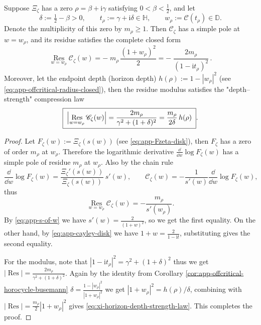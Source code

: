 \begin{theorem}\label{thm:xi-horizon-pole-residue-depth-strength}
Suppose \(\Xi_{\zeta}\) has a zero \(\rho=\beta+\mathrm{i}\gamma\) satisfying \(0<\beta<\tfrac12\), and let
\[
\delta:=\tfrac12-\beta>0,\qquad
t_{\rho}:=\gamma+\mathrm{i}\delta\in\mathbb{H},\qquad
w_{\rho}:=\mathcal{C}(t_{\rho})\in\mathbb{D}.
\]
Denote the multiplicity of this zero by \(m_{\rho}\ge 1\).
Then \(\mathscr{C}_{\zeta}\) has a simple pole at \(w=w_{\rho}\), and its residue satisfies the complete closed form
\begin{equation}\label{eq:xi-horizon-pole-residue-closed}
\boxed{\;
\operatorname*{Res}_{w=w_{\rho}}\mathscr{C}_{\zeta}(w)
=-\;m_{\rho}\,\frac{(1+w_{\rho})^{2}}{2}
=-\;\frac{2m_{\rho}}{(1-\mathrm{i}t_{\rho})^{2}}\,.
\;}
\end{equation}
Moreover, let the endpoint depth (horizon depth)
\(
h(\rho):=1-|w_{\rho}|^{2}
\)
(see \eqref{eq:app-offcritical-radius-closed}), then the residue modulus satisfies the "depth--strength" compression law
\begin{equation}\label{eq:xi-horizon-depth-strength-law}
\boxed{\;
\Bigl|\operatorname*{Res}_{w=w_{\rho}}\mathscr{C}_{\zeta}(w)\Bigr|
=\frac{2m_{\rho}}{\gamma^{2}+(1+\delta)^{2}}
=\frac{m_{\rho}}{2\delta}\,h(\rho)\; }.
\end{equation}
\end{theorem}

\begin{proof}
Let \(F_{\zeta}(w):=\Xi_{\zeta}(s(w))\) (see \eqref{eq:app-Fzeta-disk}), then \(F_{\zeta}\) has a zero of order \(m_{\rho}\) at \(w_{\rho}\).
Therefore the logarithmic derivative \(\frac{\dd}{\dd w}\log F_{\zeta}(w)\) has a simple pole of residue \(m_{\rho}\) at \(w_{\rho}\).
Also by the chain rule
\[
\frac{\dd}{\dd w}\log F_{\zeta}(w)
=\frac{\Xi_{\zeta}'(s(w))}{\Xi_{\zeta}(s(w))}\,s'(w),
\qquad
\mathscr{C}_{\zeta}(w)=-\frac{1}{s'(w)}\frac{\dd}{\dd w}\log F_{\zeta}(w),
\]
thus
\[
\operatorname*{Res}_{w=w_{\rho}}\mathscr{C}_{\zeta}(w)
=-\frac{m_{\rho}}{s'(w_{\rho})}.
\]
By \eqref{eq:app-s-of-w} we have \(s'(w)=\frac{2}{(1+w)^2}\), so we get the first equality.
On the other hand, by \eqref{eq:app-cayley-disk} we have \(1+w=\frac{2}{1-\mathrm{i}t}\), substituting gives the second equality.
\par
For the modulus, note that
\(
|1-\mathrm{i}t_{\rho}|^2=\gamma^2+(1+\delta)^2
\)
thus we get \(\bigl|\operatorname*{Res}\bigr|=\frac{2m_{\rho}}{\gamma^2+(1+\delta)^2}\).
Again by the identity from Corollary \ref{cor:app-offcritical-horocycle-busemann}
\(
\delta=\frac{1-|w_{\rho}|^2}{|1+w_{\rho}|^2}
\)
we get \(|1+w_{\rho}|^2=h(\rho)/\delta\), combining with
\(
\bigl|\operatorname*{Res}\bigr|=\frac{m_{\rho}}{2}|1+w_{\rho}|^2
\)
gives \eqref{eq:xi-horizon-depth-strength-law}. This completes the proof.
\end{proof}

